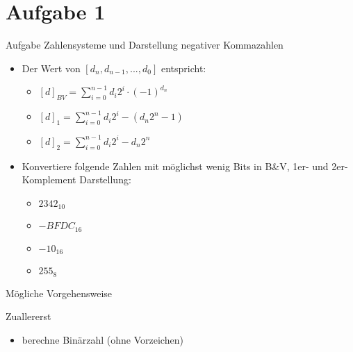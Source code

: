 
\section{Aufgabe 1}

\setcounter{exercise}{1}

\begin{frame}[allowframebreaks]{Aufgabe \thesection}{Zahlensysteme und Darstellung negativer Kommazahlen}
  \begin{requirementsnoinc}
    \begin{itemize}
      \item Der Wert von $[d_n,d_{n-1},...,d_0]$ entspricht:
      \begin{itemize}
          \item $[d]_{BV} = \sum\limits^{n-1}_{i=0}d_i 2^i \cdot(-1)^{d_n}$
          \item $[d]_1 = \sum\limits^{n-1}_{i=0}d_i 2^i - (d_n 2^n -1)$
          \item $[d]_2 = \sum\limits^{n-1}_{i=0}d_i 2^i - d_n 2^n$
      \end{itemize}
    \end{itemize}
  \end{requirementsnoinc}
  \begin{exercisenoinc}
    \begin{itemize}
      \item Konvertiere folgende Zahlen mit möglichst wenig Bits in B\&V, 1er- und 2er-Komplement Darstellung:
      \begin{itemize}
          \item $2342_{10}$
          \item $-BFDC_{16}$
          \item $-10_{16}$
          \item $255_8$
      \end{itemize}
    \end{itemize}
  \end{exercisenoinc}
  Mögliche Vorgehensweise
  \begin{block}{Zuallererst}
        \begin{itemize}
            \item berechne Binärzahl (ohne Vorzeichen)
        \end{itemize}
        \end{block}

\end{frame}
